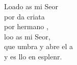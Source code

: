 \begin{cancion}
	\begin{chorus}%
	Loado as mi Seor\\
	por da criata\\
	por  hermano ,\\
	loo as mi Seor,\\
	que umbra y abre el a \\
	y es llo en esplenr.\\
	\end{chorus}%
	\jump\\
\end{cancion}%
